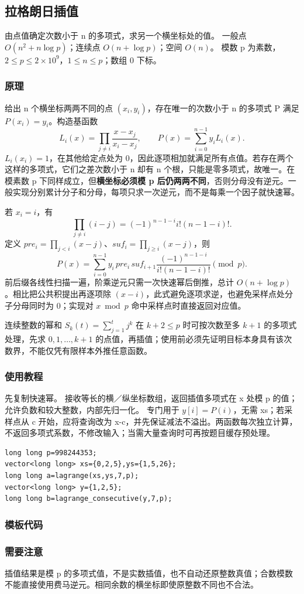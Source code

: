 \subsection{拉格朗日插值}
\label{math:lagrange}
\AlgorithmInfo
    {由点值确定次数小于 n 的多项式，求另一个横坐标处的值。}
    {一般点 $O(n^2+n\log p)$；连续点 $O(n+\log p)$；空间 $O(n)$。}
    {模数 p 为素数，$2\le p\le2\times10^9$，$1\le n\le p$；数组 0 下标。}
\subsubsection*{原理}
给出 n 个横坐标两两不同的点 $(x_i,y_i)$，存在唯一的次数小于 n 的多项式 P 满足 $P(x_i)=y_i$。构造基函数
\[
 L_i(x)=\prod_{j\ne i}\frac{x-x_j}{x_i-x_j},\qquad
 P(x)=\sum_{i=0}^{n-1}y_iL_i(x).
\]
$L_i(x_i)=1$，在其他给定点处为 0，因此逐项相加就满足所有点值。若存在两个这样的多项式，它们之差次数小于 n 却有 n 个根，只能是零多项式，故唯一。在模素数 p 下同样成立，但\textbf{横坐标必须模 p 后仍两两不同}，否则分母没有逆元。一般实现分别累计分子和分母，每项只求一次逆元，而不是每乘一个因子就快速幂。

若 $x_i=i$，有
\[
 \prod_{j\ne i}(i-j)=(-1)^{n-1-i}i!(n-1-i)!.
\]
定义 $pre_i=\prod_{j<i}(x-j)$、$suf_i=\prod_{j\ge i}(x-j)$，则
\[
 P(x)=\sum_{i=0}^{n-1}y_i\,pre_i\,suf_{i+1}
       \frac{(-1)^{n-1-i}}{i!(n-1-i)!}\pmod p.
\]
前后缀各线性扫描一遍，阶乘逆元只需一次快速幂后倒推，总计 $O(n+\log p)$。相比把公共积提出再逐项除 $(x-i)$，此式避免逐项求逆，也避免采样点处分子分母同时为 0；实现对 $x\bmod p$ 命中采样点时直接返回对应值。

连续整数的幂和 $S_k(t)=\sum_{j=1}^t j^k$ 在 $k+2\le p$ 时可按次数至多 $k+1$ 的多项式处理，先求 $0,1,\ldots,k+1$ 的点值，再插值；使用前必须先证明目标本身具有该次数界，不能仅凭有限样本外推任意函数。
\subsubsection*{使用教程}
先复制快速幂。 接收等长的横／纵坐标数组，返回插值多项式在 x 处模 p 的值；允许负数和较大整数，内部先归一化。 专门用于 $y[i]=P(i)$，无需 xs；若采样点从 c 开始，应将查询改为 x-c，并先保证减法不溢出。两函数每次独立计算，不返回多项式系数，不修改输入；当需大量查询时可再按题目缓存预处理。
\begin{lstlisting}[style=mtycpp,numbers=none]
long long p=998244353;
vector<long long> xs={0,2,5},ys={1,5,26};
long long a=lagrange(xs,ys,7,p);
vector<long long> y={1,2,5};
long long b=lagrange_consecutive(y,7,p);
\end{lstlisting}
\subsubsection*{模板代码}
\subsubsection*{需要注意}
插值结果是模 p 的多项式值，不是实数插值，也不自动还原整数真值；合数模数不能直接使用费马逆元。相同余数的横坐标即使原整数不同也不合法。
